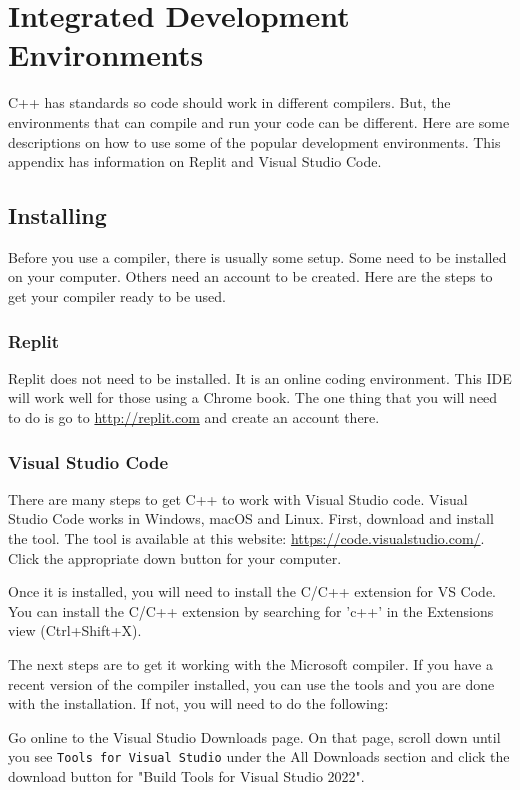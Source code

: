 

\chapter{Integrated Development Environments}
C++ has standards so code should work in different compilers. But, the 
environments that can compile and run your code can be different. Here
are some descriptions on how to use some of the popular development
environments. This appendix has information on Replit and Visual Studio Code.
\section{Installing}
\label{installide}
Before you use a compiler, there is usually some setup. Some need to
be installed on your computer. Others need an account to be created.
Here are the steps to get your compiler ready to be used.
\subsection{Replit}
Replit does not need to be installed. It is an online coding environment.
This IDE will work well for those using a Chrome book. The one thing that you will need to do is go to \url{http://replit.com} and create an 
account there.
\subsection{Visual Studio Code}
There are many steps to get C++ to work with Visual Studio code. Visual Studio Code works in Windows, macOS and Linux. First,
download and install the tool. The tool is available at this 
website: \url{https://code.visualstudio.com/}. Click the appropriate
down button for your computer.

Once it is installed, you will need to install the C/C++ extension for VS Code. You can install the C/C++ extension by searching for 'c++' in the Extensions view (Ctrl+Shift+X).

The next steps are to get it working with the Microsoft compiler.
If you have a recent version of the compiler installed, you can use the tools and you are done with the installation. If not, you will need to do the following:

Go online to the Visual Studio Downloads page. On that page, scroll
down until you see {\tt Tools for Visual Studio} under the All Downloads section and click the download button for "Build Tools for Visual Studio 2022".


